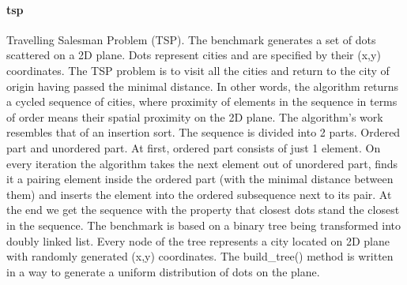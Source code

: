 \paragraph{tsp} Travelling Salesman Problem (TSP). The benchmark generates a set of dots scattered on a 2D plane. Dots represent cities and are specified by their (x,y) coordinates. The TSP problem is to visit all the cities and return to the city of origin having passed the minimal distance. In other words, the algorithm returns a cycled sequence of cities, where proximity of elements in the sequence in terms of order means their spatial proximity on the 2D plane.\newline\null
\quad The algorithm’s work resembles that of an insertion sort. The sequence is divided into 2 parts. Ordered part and unordered part. At first, ordered part consists of just 1 element. On every iteration the algorithm takes the next element out of unordered part, finds it a pairing element inside the ordered part (with the minimal distance between them) and inserts the element into the ordered subsequence next to its pair. At the end we get the sequence with the property that closest dots stand the closest in the sequence.\newline\null
\quad The benchmark is based on a binary tree being transformed into doubly linked list. Every node of the tree represents a city located on 2D plane with randomly generated (x,y) coordinates. The build\_tree() method is written in a way to generate a uniform distribution of dots on the plane.





